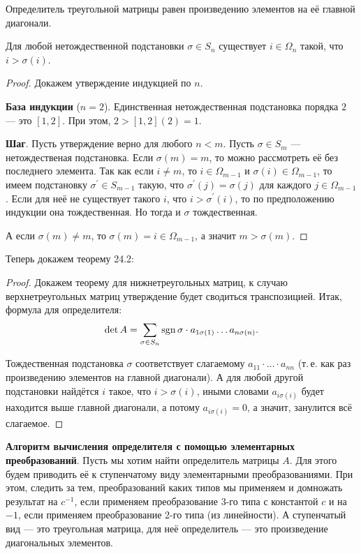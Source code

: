 \begin{theorem}
    Определитель треугольной матрицы равен произведению элементов на её главной диагонали.
\end{theorem}

\begin{lemma}
    Для любой нетождественной подстановки $\sigma \in S_n$ существует $i \in \Omega_n$ такой, что $i > \sigma(i)$.
\end{lemma}

\begin{proof}
    Докажем утверждение индукцией по $n$.

    \textbf{База индукции} ($n = 2$). Единственная нетождественная подстановка порядка $2$ --- это $[1, 2]$. При этом, $2 > [1, 2](2) = 1$.

    \textbf{Шаг}. Пусть утверждение верно для любого $n < m$. Пусть $\sigma \in S_m$ --- нетождественая подстановка. Если $\sigma(m) = m$, то можно рассмотреть её без последнего элемента. Так как если $i \ne m$, то $i \in \Omega_{m - 1}$ и $\sigma(i) \in \Omega_{m - 1}$, то имеем подстановку $\sigma^\prime \in S_{m - 1}$ такую, что $\sigma^\prime(j) = \sigma(j)$ для каждого $j \in \Omega_{m - 1}$. Если для неё не существует такого $i$, что $i > \sigma^\prime(i)$, то по предположению индукции она тождественная. Но тогда и $\sigma$ тождественная. 

    А если $\sigma(m) \ne m$, то $\sigma(m) = i \in \Omega_{m - 1}$, а значит $m > \sigma(m)$.
\end{proof}

Теперь докажем теорему 24.2:

\begin{proof}
    Докажем теорему для нижнетреугольных матриц, к случаю верхнетреугольных матриц утверждение будет сводиться транспозицией. Итак, формула для определителя:
    $$
    \det A = \sum_{\sigma \in S_n}\mathrm{sgn}\,\sigma \cdot a_{1\sigma(1)}\ldots a_{n\sigma(n)}.
    $$

    Тождественная подстановка $\sigma$ соответствует слагаемому $a_{11} \cdot \ldots \cdot a_{nn}$ (т.\,е. как раз произведению элементов на главной диагонали). А для любой другой подстановки найдётся $i$ такое, что $i > \sigma(i)$, иными словами $a_{i\sigma(i)}$ будет находится выше главной диагонали, а потому $a_{i\sigma(i)} = 0$, а значит, занулится всё слагаемое.
\end{proof}

\textbf{Алгоритм вычисления определителя с помощью элементарных преобразований}. Пусть мы хотим найти определитель матрицы $A$. Для этого будем приводить её к ступенчатому виду элементарными преобразованиями. При этом, следить за тем, преобразований каких типов мы применяем и домножать результат на $c^{-1}$, если применяем преобразование 3-го типа с константой $c$ и на $-1$, если применяем преобразование 2-го типа (из линейности). А ступенчатый вид --- это треугольная матрица, для неё определитель --- это произведение диагональных элементов.

